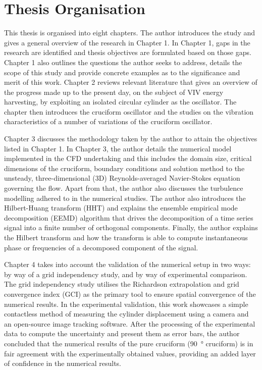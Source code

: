 \documentclass[oneside]{utmthesis}
\begin{document}
\section{Thesis Organisation}
This thesis is organised into eight chapters. The author introduces the study and gives a general overview of the research in Chapter 1. In Chapter 1, gaps in the research are identified and thesis objectives are formulated based on those gaps. Chapter 1 also outlines the questions the author seeks to address, details the scope of this study and provide concrete examples as to the significance and merit of this work. Chapter 2 reviews relevant literature that gives an overview of the progress made up to the present day, on the subject of VIV energy harvesting, by exploiting an isolated circular cylinder as the oscillator. The chapter then introduces the cruciform oscillator and the studies on the vibration characteristics of a number of variations of the cruciform oscillator.

Chapter 3 discusses the methodology taken by the author to attain the objectives listed in Chapter 1. In Chapter 3, the author details the numerical model implemented in the CFD undertaking and this includes the domain size, critical dimensions of the cruciform, boundary conditions and solution method to the unsteady, three-dimensional (3D) Reynolds-averaged Navier-Stokes equation governing the flow. Apart from that, the author also discusses the turbulence modelling adhered to in the numerical studies. The author also introduces the Hilbert-Huang transform (HHT) and explains the ensemble empirical mode decomposition (EEMD) algorithm that drives the decomposition of a time series signal into a finite number of orthogonal components. Finally, the author explains the Hilbert transform and how the transform is able to compute instantaneous phase or frequencies of a decomposed component of the signal.

Chapter 4 takes into account the validation of the numerical setup in two ways: by way of a grid independency study, and by way of experimental comparison. The grid independency study utilises the Richardson extrapolation and grid convergence index (GCI) as the primary tool to ensure spatial convergence of the numerical results. In the experimental validation, this work showcases a simple contactless method of measuring the cylinder displacement using a camera and an open-source image tracking software. After the processing of the experimental data to compute the uncertainty and present them as error bars, the author concluded that the numerical results of the pure cruciform (\SI{90}{\degree} cruciform) is in fair agreement with the experimentally obtained values, providing an added layer of confidence in the numerical results.
\end{document}
